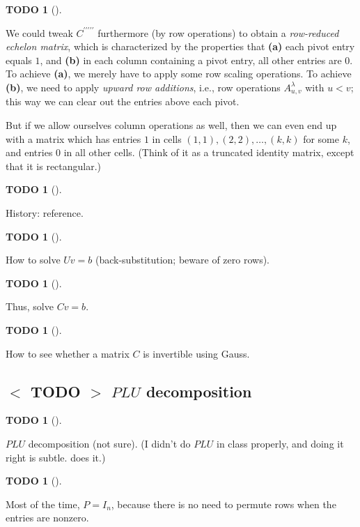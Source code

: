 \documentclass[numbers=enddot,12pt,final,onecolumn,notitlepage]{scrartcl}%
\theoremstyle{definition}
\newtheorem{quest}[theo]{TODO}
\newenvironment{todo}[1][]
{\begin{quest}[#1]\begin{leftbar}}
{\end{leftbar}\end{quest}}
\begin{document}
\begin{todo}
We could tweak $C^{\prime\prime\prime\prime\prime}$ furthermore (by row
operations) to obtain a \textit{row-reduced echelon matrix}, which is
characterized by the properties that \textbf{(a)} each pivot entry equals $1$,
and \textbf{(b)} in each column containing a pivot entry, all other entries
are $0$. To achieve \textbf{(a)}, we merely have to apply some row scaling
operations. To achieve \textbf{(b)}, we need to apply \textit{upward row
additions}, i.e., row operations $A_{u,v}^{\lambda}$ with $u<v$; this way we
can clear out the entries above each pivot.

But if we allow ourselves column operations as well, then we can even end up
with a matrix which has entries $1$ in cells $\left(  1,1\right)  ,\left(
2,2\right)  ,\ldots,\left(  k,k\right)  $ for some $k$, and entries $0$ in all
other cells. (Think of it as a truncated identity matrix, except that it is rectangular.)
\end{todo}

\begin{todo}
History: \cite{Grcar10} reference.
\end{todo}

\begin{todo}
How to solve $Uv=b$ (back-substitution; beware of zero rows).
\end{todo}

\begin{todo}
Thus, solve $Cv=b$.
\end{todo}

\begin{todo}
How to see whether a matrix $C$ is invertible using Gauss.
\end{todo}

\subsection{%
$<$%
TODO%
$>$
$PLU$ decomposition}

\begin{todo}
$PLU$ decomposition (not sure). (I didn't do $PLU$ in class properly, and
doing it right is subtle. \cite[Example 1.12]{OlvSha06} does it.)
\end{todo}

\begin{todo}
Most of the time, $P=I_{n}$, because there is no need to permute rows when the
entries are nonzero.
\end{todo}
\end{document}

